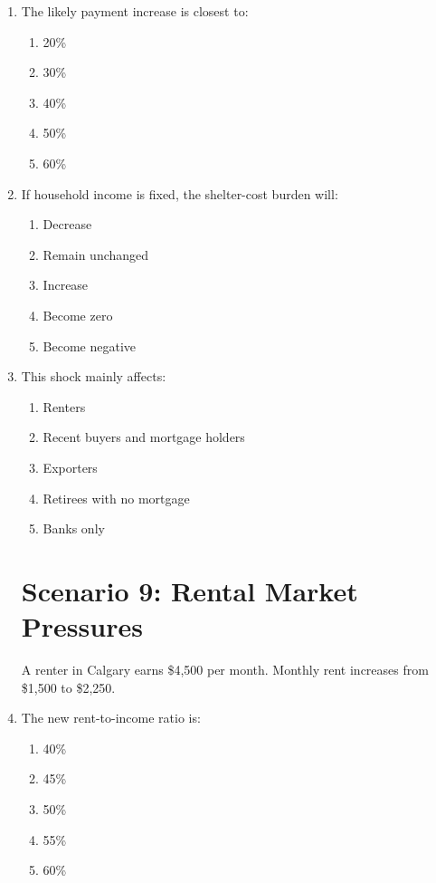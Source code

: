 \documentclass[12pt]{article}
\begin{document}
\begin{enumerate}[label=\textbf{\arabic*.}]
\section*{Scenario 8: Mortgage Renewal Shock in Canada}

A Canadian homeowner took out a \$650,000 mortgage at a 2.3\% interest rate five years ago. At renewal, the mortgage rate rises to 6.1\%.

\item The likely payment increase is closest to:
\begin{enumerate}[label=\Alph*.]
\item 20\%
\item 30\%
\item 40\%
\item 50\%
\item 60\%
\end{enumerate}
\newpage
\item If household income is fixed, the shelter-cost burden will:
\begin{enumerate}[label=\Alph*.]
\item Decrease
\item Remain unchanged
\item Increase
\item Become zero
\item Become negative
\end{enumerate}

\item This shock mainly affects:
\begin{enumerate}[label=\Alph*.]
\item Renters
\item Recent buyers and mortgage holders
\item Exporters
\item Retirees with no mortgage
\item Banks only
\end{enumerate}

\section*{Scenario 9: Rental Market Pressures}

A renter in Calgary earns \$4,500 per month. Monthly rent increases from \$1,500 to \$2,250.

\item The new rent-to-income ratio is:
\begin{enumerate}[label=\Alph*.]
\item 40\%
\item 45\%
\item 50\%
\item 55\%
\item 60\%
\end{enumerate}


\end{enumerate}
\end{document}
